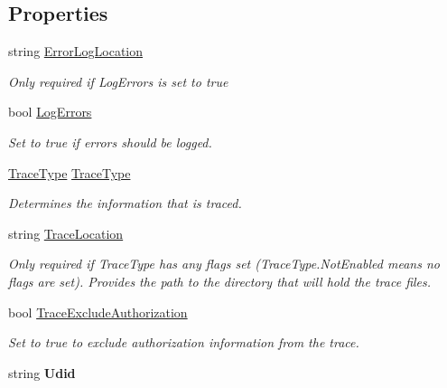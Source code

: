 \subsection*{Properties}
\begin{DoxyCompactItemize}
\item 
string \hyperlink{class_file_monitor_1_1_sync_settings_1_1_sync_settings_a4e6fa569b8cb0225a0223098d663d090}{Error\-Log\-Location}
\begin{DoxyCompactList}\small\item\em Only required if Log\-Errors is set to true \end{DoxyCompactList}\item 
bool \hyperlink{class_file_monitor_1_1_sync_settings_1_1_sync_settings_a2b08e2d5a5217a177d1ccbba1fe4fc9a}{Log\-Errors}
\begin{DoxyCompactList}\small\item\em Set to true if errors should be logged. \end{DoxyCompactList}\item 
\hyperlink{namespace_cloud_api_public_1_1_static_a7e5ae8f2a85f427de3d6c8a5afcbb029}{Trace\-Type} \hyperlink{class_file_monitor_1_1_sync_settings_1_1_sync_settings_a8308cc7db6b010431466936685dc1914}{Trace\-Type}
\begin{DoxyCompactList}\small\item\em Determines the information that is traced. \end{DoxyCompactList}\item 
string \hyperlink{class_file_monitor_1_1_sync_settings_1_1_sync_settings_a4206b1a552e8ade9c6442b9e3e67d1ff}{Trace\-Location}
\begin{DoxyCompactList}\small\item\em Only required if Trace\-Type has any flags set (Trace\-Type.\-Not\-Enabled means no flags are set). Provides the path to the directory that will hold the trace files. \end{DoxyCompactList}\item 
bool \hyperlink{class_file_monitor_1_1_sync_settings_1_1_sync_settings_a632e1de1bd05560e8664e710fd53cf05}{Trace\-Exclude\-Authorization}
\begin{DoxyCompactList}\small\item\em Set to true to exclude authorization information from the trace. \end{DoxyCompactList}\item 
\hypertarget{class_file_monitor_1_1_sync_settings_1_1_sync_settings_a6271f17fd011457b55a4bfb638e2e894}{string {\bfseries Udid}}\label{class_file_monitor_1_1_sync_settings_1_1_sync_settings_a6271f17fd011457b55a4bfb638e2e894}


\end{DoxyCompactItemize}
